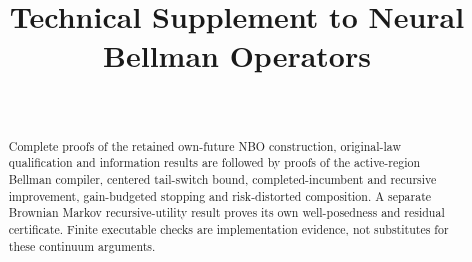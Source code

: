\documentclass[ecta,nameyear,draft]{econsocart}
\begin{document}
\begin{frontmatter}
\title{Technical Supplement to Neural Bellman Operators}
\begin{aug}
\author[id=au1,addressref={add1}]{~}
\address[id=add1]{Peking University}
\end{aug}
\begin{abstract}Complete proofs of the retained own-future NBO construction, original-law qualification and information results are followed by proofs of the active-region Bellman compiler, centered tail-switch bound, completed-incumbent and recursive improvement, gain-budgeted stopping and risk-distorted composition. A separate Brownian Markov recursive-utility result proves its own well-posedness and residual certificate. Finite executable checks are implementation evidence, not substitutes for these continuum arguments.\end{abstract}
\end{frontmatter}













\end{document}
